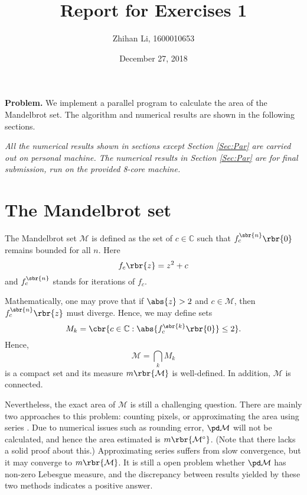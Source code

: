 \documentclass[english, nochinese]{pnote}
\title{Report for Exercises 1}
\author{Zhihan Li, 1600010653}
\date{December 27, 2018}
\begin{document}
\maketitle

\textbf{Problem.} We implement a parallel program to calculate the area of the Mandelbrot set. The algorithm and numerical results are shown in the following sections.

\emph{All the numerical results shown in sections except Section \ref{Sec:Par} are carried out on personal machine. The numerical results in Section \ref{Sec:Par} are for final submission, run on the provided 8-core machine.}

\section{The Mandelbrot set}

The Mandelbrot set $\mathcal{M}$ is defined as the set of $ c \in \mathbb{C} $ such that $ f_c^{\sbr{n}} \rbr{0} $ remains bounded for all $n$. Here
\begin{equation}
f_c \rbr{z} = z^2 + c
\end{equation}
and $f_c^{\sbr{n}}$ stands for iterations of $f_c$.

Mathematically, one may prove that if $ \abs{z} > 2 $ and $ c \in \mathcal{M} $, then $ f_c^{\sbr{n}} \rbr{z} $ must diverge. Hence, we may define sets
\begin{equation}
M_k = \cbr{ c \in \mathbb{C} : \abs{ f_c^{\sbr{k}} \rbr{0} } \le 2 }.
\end{equation}
Hence,
\begin{equation}
\mathcal{M} = \bigcap_k M_k
\end{equation}
is a compact set and its measure $ m \rbr{\mathcal{M}} $ is well-defined. In addition, $\mathcal{M}$ is connected.

Nevertheless, the exact area of $\mathcal{M}$ is still a challenging question. There are mainly two approaches to this problem: counting pixels, or approximating the area using series \parencite{ewing_area_1992}. Due to numerical issues such as rounding error, $ \pd \mathcal{M} $ will not be calculated, and hence the area estimated is $ m \rbr{\mathcal{M}^{\circ}} $. (Note that there lacks a solid proof about this.) Approximating series suffers from slow convergence, but it may converge to $ m \rbr{\mathcal{M}} $. It is still a open problem whether $ \pd \mathcal{M} $ has non-zero Lebesgue measure, and the discrepancy between results yielded by these two methods indicates a positive answer.
\end{document}
